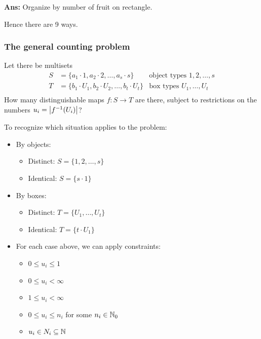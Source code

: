 \documentclass[12pt]{article}
\begin{document}
\textbf{Ans:} Organize by number of fruit on rectangle.

Hence there are 9 ways.

\subsubsection{The general counting problem}
Let there be multisets \begin{align*}
    S&=\{a_1\cdot 1, a_2\cdot2, \dots, a_s\cdot s\} &\text{object types }1,2,\dots,s\\
    T&=\{b_1\cdot U_1, b_2\cdot U_2,\dots,b_t\cdot U_t\} &\text{box types }U_1,\dots,U_t\\
\end{align*}
How many distinguishable maps $f: S\to T$ are there, subject to restrictions on the numbers $u_i=\left|f^{-1}(U_i)\right|$?

 To recognize which situation applies to the problem:
\begin{itemize}
    \item By objects:\begin{itemize}
        \item Distinct: $S=\{1,2,\dots,s\}$
        \item Identical: $S=\{s\cdot 1\}$
    \end{itemize}
    \item By boxes: \begin{itemize}
        \item Distinct: $T=\{U_1,\dots, U_t\}$
        \item Identical: $T=\{t\cdot U_1\}$
    \end{itemize}
    \item For each case above, we can apply constraints:\begin{itemize}
        \item $0\leq u_i\leq 1$
        \item $0\leq u_i<\infty$
        \item $1\leq u_i<\infty$
        \item $0\leq u_i\leq n_i$ for some $n_i\in \mathbb{N}_0$
        \item $u_i\in N_i\subseteq \mathbb{N}$
    \end{itemize}
\end{itemize}
\end{document}
